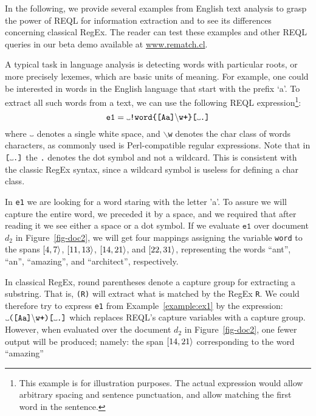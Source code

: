 In the following, we provide several examples from English text analysis to
grasp the power of REQL for information extraction and to see its differences
concerning classical RegEx. The reader can test these examples and other REQL
queries in our \rematch{} beta demo available at \url{www.rematch.cl}.
\begin{example}\label{example:ex1} A typical task in language analysis is
detecting words with particular roots, or more precisely lexemes, which are
basic units of meaning. For example, one could be interested in words in the
English language that start with the prefix `a'. To extract all such words from
a text, we can use the following REQL expression\footnote{This example is for
illustration purposes. The actual expression would allow arbitrary spacing and
sentence punctuation, and allow matching the first word in the sentence.}:
$$
\texttt{e1} = \Vtextvisiblespace \texttt{!word\{[Aa]}\backslash \texttt{w+\}[}\Vtextvisiblespace \texttt{.]}
$$
\noindent
where $\Vtextvisiblespace$ denotes a single white space, and
$\backslash$\texttt{w} denotes the char class of words characters, as commonly
used is Perl-compatible regular expressions. Note that in
$\texttt{[}\Vtextvisiblespace \texttt{.]}$ the \texttt{.} denotes the dot symbol
and not a wildcard. This is consistent with the classic RegEx syntax, since a
wildcard symbol is useless for defining a char class.

In \texttt{e1} we are looking for a word staring with the letter 'a'. To assure
we will capture the entire word, we preceded it by a space, and we required that
after reading it we see either a space or a dot symbol. If we evaluate
$\texttt{e1}$ over document $d_2$ in Figure~\ref{fig-doc2}, we will get four
mappings assigning the variable \texttt{word} to the spans $[4, 7\rangle$,
$[11, 13\rangle$, $[14, 21\rangle$, and $[22, 31\rangle$, representing the words
``ant'', ``an'', ``amazing'', and ``architect'', respectively.
\end{example}
In classical RegEx, round parentheses denote a capture group for extracting a
substring. That is,  \texttt{(R)} will extract what is matched by the RegEx
\texttt{R}. We could therefore try to express \texttt{e1} from
Example~\ref{example:ex1} by the expression: $\Vtextvisiblespace
\texttt{([Aa]}\backslash \texttt{w+)[}\Vtextvisiblespace \texttt{.]}$ which
replaces REQL's capture variables with a capture group. However, when evaluated
over the document $d_2$ in Figure~\ref{fig-doc2}, one fewer output will be
produced; namely: the span $[14, 21\rangle$ corresponding to the word ``amazing''
